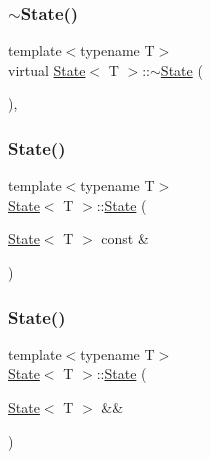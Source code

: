 \subsubsection{\texorpdfstring{$\sim$\+State()}{~State()}}
{\footnotesize\ttfamily template$<$typename T$>$ \\
virtual \hyperlink{class_state}{State}$<$ T $>$\+::$\sim$\hyperlink{class_state}{State} (\begin{DoxyParamCaption}{ }\end{DoxyParamCaption})\hspace{0.3cm}{\ttfamily [virtual]}, {\ttfamily [default]}}

\mbox{\label{class_state_af2011c359fcd894caa8808267214476d}} 
\subsubsection{\texorpdfstring{State()}{State()}\hspace{0.1cm}{\footnotesize\ttfamily [1/3]}}
{\footnotesize\ttfamily template$<$typename T$>$ \\
\hyperlink{class_state}{State}$<$ T $>$\+::\hyperlink{class_state}{State} (\begin{DoxyParamCaption}\item[{\hyperlink{class_state}{State}$<$ T $>$ const \&}]{ }\end{DoxyParamCaption})\hspace{0.3cm}{\ttfamily [delete]}}

\mbox{\label{class_state_aea2dbf8f9a48af8f95059cbbef0234e0}} 
\subsubsection{\texorpdfstring{State()}{State()}\hspace{0.1cm}{\footnotesize\ttfamily [2/3]}}
{\footnotesize\ttfamily template$<$typename T$>$ \\
\hyperlink{class_state}{State}$<$ T $>$\+::\hyperlink{class_state}{State} (\begin{DoxyParamCaption}\item[{\hyperlink{class_state}{State}$<$ T $>$ \&\&}]{ }\end{DoxyParamCaption})\hspace{0.3cm}{\ttfamily [delete]}}

